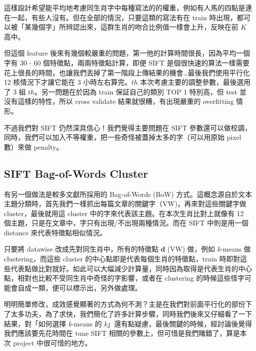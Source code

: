 這樣設計希望能平均地考慮同生肖字中每種寫法的的權重，例如有人馬的四點是連在一起，有些人沒有。但在全部的情況，只要這類的寫法有在 train 時出現，都可以被「某幾個字」所辨認出來，這群生肖的吻合比例值一樣會上升，反映在前 $K$ 高中。

但這個 feature 後來有幾個較嚴重的問題，第一他的計算時間很長，因為平均一個字有 30 - 60 個特徵點，兩兩特徵點計算，即便 SIFT 是個很快速的算法一樣需要花上很長的時間，也讓我們丟掉了第一階段上傳結果的機會…最後我們使用平行化 12 核情況下才讓它能在 3 小時左右算完。$th$ 本次考慮主要的調整參數，最後選用了 3 組 $th$。另一問題在於因為 train 保証自己的類別 TOP 1 特別高，但 test 並沒有這樣的特性，所以 cross validate 結果就很糟，有出現嚴重的 overfitting 情形。

不過我們對 SIFT 仍然深具信心！我們覺得主要問題在 SIFT 參數還可以做校調，同時，我們可以加入不等權重，把一些奇怪被蓋掉太多的字（可以用原始 pixel 數）來做 penalty。

\subsection*{SIFT Bag-of-Words Cluster}
有另一個做法是較多文獻所採用的 Bag-of-Words (BoW) 方式。這概念源自於文本主題分類時，首先我們一樣抓出每篇文章的關鍵字（VW)，再來對這些關鍵字做 cluster，最後就用這 cluster 中的字來代表該主題。在本次生肖比對上就像有 12 個主題，只是在文章中，字只有出現/不出現兩種情況。而在 SIFT 中則是用一個 distance 來代表特徵點相似情況。

只要將 datawise 改成先對同生肖中，所有的特徵點 $\mathbf{d}$ (VW) 做，例如 \textit{k}-means 做 clustering，而這些 cluster 的中心點即是代表每個生肖的特徵點，train 時即對這些代表點做比對就好。如此可以大幅減少計算量，同時因為取得是代表生肖的中心點，相對也比較不受同生肖中奇怪的字影響，或者在 clustering 的時候這些怪字可能會自成一類，便可以標示出，另外做處理。

明明簡單修改，成效感覺顯著的方式為何不測？主是在我們對前面平行化的部份下了太多功夫，為了求快，我們簡化了許多計算步驟，同時我們後來又仔細看了一下結果，對「如何選擇 \textit{k}-means 的 \textit{k}」還有點疑慮，最後關鍵的時候，經討論後覺得我們應該要先花時間在 tune SIFT 相關的參數上，但可惜是我們賭錯了，算是本次 project 中很可惜的地方。


